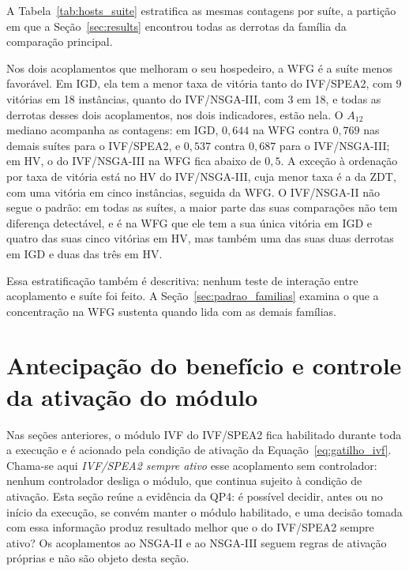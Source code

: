 A Tabela~\ref{tab:hosts_suite} estratifica as mesmas contagens por suíte, a partição em que a Seção~\ref{sec:results} encontrou todas as derrotas da família da comparação principal.



Nos dois acoplamentos que melhoram o seu hospedeiro, a WFG é a suíte menos favorável. Em IGD, ela tem a menor taxa de vitória tanto do IVF/SPEA2, com 9 vitórias em 18 instâncias, quanto do IVF/NSGA-III, com 3 em 18, e todas as derrotas desses dois acoplamentos, nos dois indicadores, estão nela. O $A_{12}$ mediano acompanha as contagens: em IGD, $0{,}644$ na WFG contra $0{,}769$ nas demais suítes para o IVF/SPEA2, e $0{,}537$ contra $0{,}687$ para o IVF/NSGA-III; em HV, o do IVF/NSGA-III na WFG fica abaixo de $0{,}5$. A exceção à ordenação por taxa de vitória está no HV do IVF/NSGA-III, cuja menor taxa é a da ZDT, com uma vitória em cinco instâncias, seguida da WFG. O IVF/NSGA-II não segue o padrão: em todas as suítes, a maior parte das suas comparações não tem diferença detectável, e é na WFG que ele tem a sua única vitória em IGD e quatro das suas cinco vitórias em HV, mas também uma das suas duas derrotas em IGD e duas das três em HV.

Essa estratificação também é descritiva: nenhum teste de interação entre acoplamento e suíte foi feito. A Seção~\ref{sec:padrao_familias} examina o que a concentração na WFG sustenta quando lida com as demais famílias.

\section{Antecipação do benefício e controle da ativação do módulo}
\label{sec:ativacao}

Nas seções anteriores, o módulo IVF do IVF/SPEA2 fica habilitado durante toda a execução e é acionado pela condição de ativação da Equação~\ref{eq:gatilho_ivf}. Chama-se aqui \emph{IVF/SPEA2 sempre ativo} esse acoplamento sem controlador: nenhum controlador desliga o módulo, que continua sujeito à condição de ativação. Esta seção reúne a evidência da QP4: é possível decidir, antes ou no início da execução, se convém manter o módulo habilitado, e uma decisão tomada com essa informação produz resultado melhor que o do IVF/SPEA2 sempre ativo? Os acoplamentos ao NSGA-II e ao NSGA-III seguem regras de ativação próprias e não são objeto desta seção.

